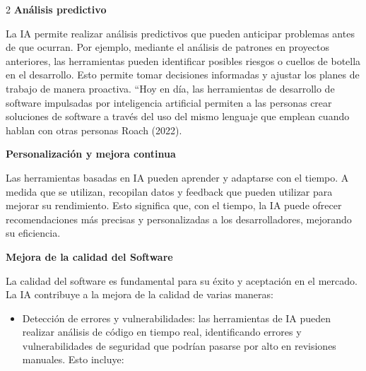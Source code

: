 \documentclass[12pt,spanish,Letterpaper,openany]{book}
\begin{document}
\begin {multicols}{2}
\textbf{Análisis predictivo}

La IA permite realizar análisis predictivos que pueden anticipar problemas antes de que ocurran. Por ejemplo, mediante el análisis de patrones en proyectos anteriores, las herramientas pueden identificar posibles riesgos o cuellos de botella en el desarrollo. Esto permite tomar decisiones informadas y ajustar los planes de trabajo de manera proactiva. ``Hoy en día, las herramientas de desarrollo de software impulsadas por inteligencia artificial permiten a las personas crear soluciones de software a través del uso del mismo lenguaje que emplean cuando hablan con otras personas Roach (2022).

\bigskip
\bigskip
\bigskip
\bigskip

\textbf{Personalización y mejora continua}

Las herramientas basadas en IA pueden aprender y adaptarse con el tiempo. A medida que se utilizan, recopilan datos y feedback que pueden utilizar para mejorar su rendimiento. Esto significa que, con el tiempo, la IA puede ofrecer recomendaciones más precisas y personalizadas a los desarrolladores, mejorando su eficiencia.

\textbf{Mejora de la calidad del Software}

La calidad del software es fundamental para su éxito y aceptación en el mercado. La IA contribuye a la mejora de la calidad de varias maneras:

\begin{itemize}
\item
  Detección de errores y vulnerabilidades: las herramientas de IA pueden realizar análisis de código en tiempo real, identificando errores y vulnerabilidades de seguridad que podrían pasarse por alto en revisiones manuales. Esto incluye:


\end{itemize}
\end{multicols}
\end{document}
